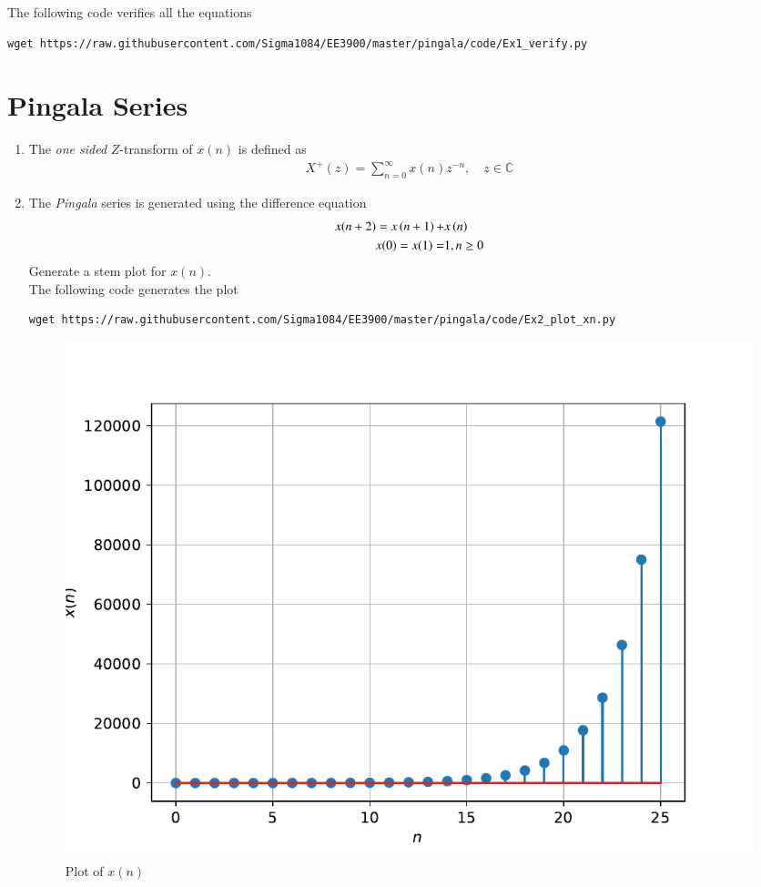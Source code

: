 \documentclass[journal,12pt,twocolumn]{IEEEtran}
\renewcommand\thesection{\arabic{section}}
\begin{document}
\solution
	The following code verifies all the equations
	\begin{lstlisting}
wget https://raw.githubusercontent.com/Sigma1084/EE3900/master/pingala/code/Ex1_verify.py
	\end{lstlisting}



\section{Pingala Series}

\begin{enumerate}[label=\thesection.\arabic*,ref=\thesection.\theenumi]

\item The {\em one sided} $Z$-transform of $x(n)$ is defined as 
	\begin{align}
		X^{+}(z) = \sum_{n = 0}^{\infty}x(n)z^{-n}, \quad z \in \mathbb{C}
		\label{eq:one-Z}
	\end{align}

\item The {\em Pingala} series is generated using the difference equation 
	\begin{align}
		\begin{split} \label{eq:10-pingala}
			x(n+2) = x\left(n+1\right) +& x\left(n\right) \\
			x(0) = x(1) =& 1, n \ge 0
		\end{split}
	\end{align}
	Generate a stem plot for $x(n)$. \\
	\solution The following code generates the plot
	\begin{lstlisting}
wget https://raw.githubusercontent.com/Sigma1084/EE3900/master/pingala/code/Ex2_plot_xn.py
	\end{lstlisting}
	\begin{figure}[!htp]
		\includegraphics[width=\columnwidth]{../figs/x_n.pdf}
		\caption{Plot of $x(n)$}
		\label{fig:x-n}
	\end{figure}



\end{enumerate}
\end{document}
